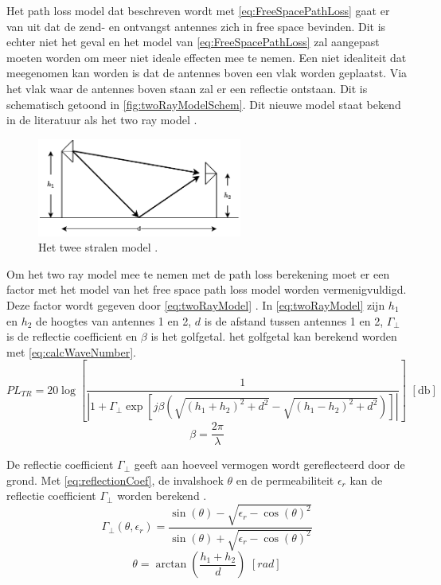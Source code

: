 Het path loss model dat beschreven wordt met \autoref{eq:FreeSpacePathLoss} gaat er van uit dat de zend- en ontvangst antennes zich in free space bevinden. Dit is echter niet het geval en het model van \autoref{eq:FreeSpacePathLoss} zal aangepast moeten worden om meer niet ideale effecten mee te nemen. Een niet idealiteit dat meegenomen kan worden is dat de antennes boven een vlak worden geplaatst. Via het vlak waar de antennes boven staan zal er een reflectie ontstaan. Dit is schematisch getoond in \autoref{fig:twoRayModelSchem}. Dit nieuwe model staat bekend in de literatuur als het two ray model \cite{MobileAntenaSystemsHandbookCH2}.
\begin{figure}[h]
    \centering
    \includegraphics[width=0.6\textwidth]{img/twoRayModel}
    \caption{Het twee stralen model \cite{MobileAntenaSystemsHandbookCH2}.}
    \label{fig:twoRayModelSchem}
\end{figure}

Om het two ray model mee te nemen met de path loss berekening moet er een factor met het model van het free space path loss model worden vermenigvuldigd. Deze factor wordt gegeven door \autoref{eq:twoRayModel} \cite{MobileAntenaSystemsHandbookCH2,brini2019system}. In \autoref{eq:twoRayModel} zijn $h_1$ en $h_2$ de hoogtes van antennes 1 en 2, $d$ is de afstand tussen antennes 1 en 2, $\Gamma_\bot$ is de reflectie coefficient en $\beta$ is het golfgetal. het golfgetal kan berekend worden met \autoref{eq:calcWaveNumber}. 
\begin{equation}\label{eq:twoRayModel}
    PL_{TR}=20\log\left[\frac{1}{\left|1+\Gamma_\bot\exp\left[j\beta \left(\sqrt{\left(h_1+h_2\right)^2+d^2}-\sqrt{\left(h_1-h_2\right)^2+d^2}\right)\right]\right|}\right] \,\,\left[\unit{\decibel}\right]
\end{equation}
\begin{equation}\label{eq:calcWaveNumber}
    \beta=\frac{2\pi}{\lambda}
\end{equation}

De reflectie coefficient $\Gamma_\bot$ geeft aan hoeveel vermogen wordt gereflecteerd door de grond. Met \autoref{eq:reflectionCoef}, de invalshoek $\theta$ en de permeabiliteit $\epsilon_r$ kan de reflectie coefficient $\Gamma_\bot$ worden berekend \cite{bacco2014uavs,sommer2012applicability}.
\begin{equation}\label{eq:reflectionCoef}
    \Gamma_\bot\left(\theta, \epsilon_r\right)=\frac{\sin\left(\theta\right)-\sqrt{\epsilon_r-\cos\left(\theta\right)^2}}{\sin\left(\theta\right)+\sqrt{\epsilon_r-\cos\left(\theta\right)^2}}
\end{equation}
\begin{equation}
    \theta=\arctan\left(\frac{h_1+h_2}{d}\right)\,\,\unit{\left[rad\right]}
\end{equation}

